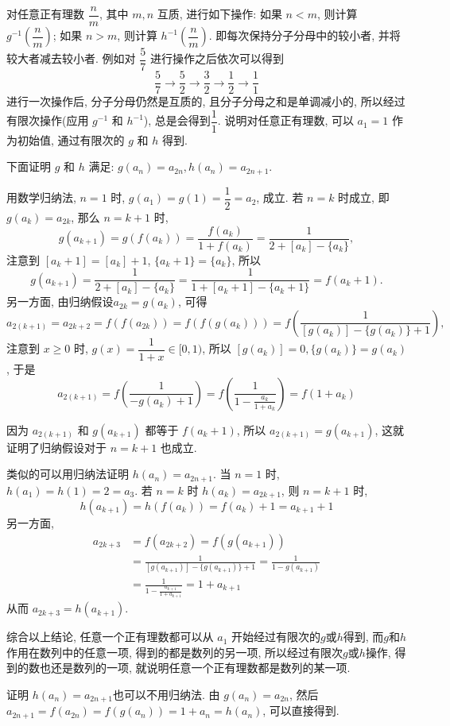 对任意正有理数 $\dfrac{n}{m}$, 其中 $m,n$ 互质, 进行如下操作: 如果 $n < m$, 则计算 $g^{-1}(\dfrac{n}{m})$; 如果 $ n > m$, 则计算 $h^{-1}(\dfrac{n}{m})$. 即每次保持分子分母中的较小者, 并将较大者减去较小者. 例如对 $\dfrac{5}{7}$ 进行操作之后依次可以得到
\[
\frac{5}{7} \rightarrow \frac{5}{2}  \rightarrow \frac{3}{2} \rightarrow \frac{1}{2} \rightarrow \frac{1}{1}
\]
进行一次操作后, 分子分母仍然是互质的, 且分子分母之和是单调减小的, 所以经过有限次操作(应用 $g^{-1}$ 和 $h^{-1}$), 总是会得到$\dfrac{1}{1}$. 说明对任意正有理数, 可以 $a_1 = 1$ 作为初始值, 通过有限次的 $g$ 和 $h$ 得到.

下面证明 $g$ 和 $h$ 满足: $g(a_n) = a_{2n}, h(a_n) = a_{2n+1}$. 

用数学归纳法, $n=1$ 时, $g(a_1) = g(1) = \dfrac{1}{2} = a_2$, 成立. 若 $n=k$ 时成立, 即$g(a_k) = a_{2k}$, 那么 $n=k+1$ 时, 
\[
g(a_{k+1}) = g(f(a_k)) = \frac{f(a_k)}{1+f(a_k)} = \frac{1}{2 + [a_k] - \{a_k\}} ,
\]
注意到 $[a_k+1] = [a_k] + 1$, $\{a_k+1\} = \{a_k\}$, 所以
\[
g(a_{k+1}) = \frac{1}{2+[a_k] - \{a_k\}} = \frac{1}{1+[a_k+1] - \{a_k+1\}} = f(a_k+1) .
\]
另一方面, 由归纳假设$a_{2k} = g(a_k)$, 可得
\[
a_{2(k+1)} = a_{2k+2} = f(f(a_{2k})) = f(f(g(a_k))) = f\left(\frac{1}{[g(a_k)] - \{g(a_k)\} + 1}\right),
\]
注意到 $x\ge 0$ 时, $g(x)=\dfrac{1}{1+x} \in [0,1)$, 所以 $[g(a_k)] = 0, \{g(a_k)\} = g(a_k)$, 于是
\[
a_{2(k+1)} = f\left(\frac{1}{-g(a_k) + 1}\right) = f\left(\frac{1}{1 - \frac{a_k}{1+a_k} }\right) = f(1+a_k)
\]

因为 $a_{2(k+1)}$ 和 $g(a_{k+1})$ 都等于 $f(a_k+1)$, 所以 $a_{2(k+1)} = g(a_{k+1})$, 这就证明了归纳假设对于 $n=k+1$ 也成立.

类似的可以用归纳法证明 $h(a_n) = a_{2n+1}$. 当 $n = 1$ 时, $h(a_1) = h(1) = 2 = a_3$. 若 $n=k$ 时 $h(a_k) = a_{2k+1}$,  则 $n=k+1$ 时, 
\[
h(a_{k+1}) = h(f(a_k)) = f(a_k)+1 = a_{k+1} + 1
\]
另一方面, 
\begin{align*}
a_{2k+3} &= f(a_{2k+2}) = f(g(a_{k+1}))\\
& = \frac{1}{[g(a_{k+1})] - \{g(a_{k+1})\} + 1} = \frac{1}{1-g(a_{k+1})} \\
&= \frac{1}{1-\frac{a_{k+1}}{1+a_{k+1}}} = 1 + a_{k+1}
\end{align*}
从而 $a_{2k+3} = h(a_{k+1})$.

综合以上结论, 任意一个正有理数都可以从 $a_1$ 开始经过有限次的$g$或$h$得到, 而$g$和$h$ 作用在数列中的任意一项, 得到的都是数列的另一项, 所以经过有限次$g$或$h$操作, 得到的数也还是数列的一项, 就说明任意一个正有理数都是数列的某一项. 

证明 $h(a_n) = a_{2n+1}$也可以不用归纳法. 由 $g(a_n) = a_{2n}$, 然后 $a_{2n+1} = f(a_{2n}) = f(g(a_n)) = 1+a_n = h(a_n)$, 可以直接得到.

